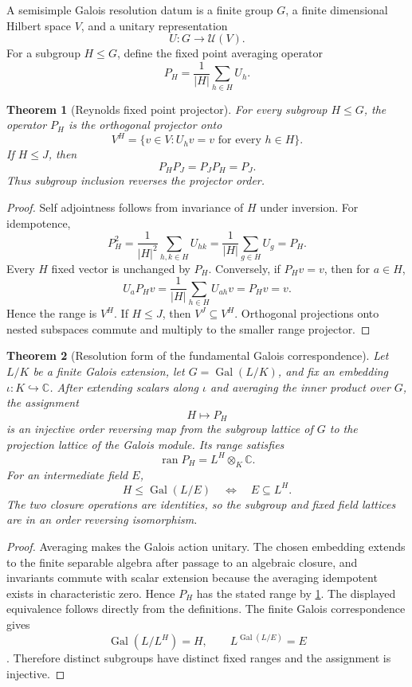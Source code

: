 \documentclass{aomart}
\newtheorem{theorem}{Theorem}[section]
\theoremstyle{definition}
\theoremstyle{remark}
\newcommand{\CC}{\mathbb C}
\newcommand{\ran}{\operatorname{ran}}
\newcommand{\Gal}{\operatorname{Gal}}
\newcommand{\Rcite}[1]{\cite{#1}}
\begin{document}
\begin{definition}\label{def:galois_resolution_datum}
A semisimple Galois resolution datum is a finite group \(G\), a finite dimensional Hilbert space \(V\), and a unitary representation
\[
 U:G\longrightarrow\mathcal U(V).
\]
For a subgroup \(H\leq G\), define the fixed point averaging operator
\[
 \boxed{
 P_H
 =
 \frac1{|H|}\sum_{h\in H}U_h.
 }
\]
\end{definition}

\begin{theorem}[Reynolds fixed point projector]\label{thm:reynolds_projector}
For every subgroup \(H\leq G\), the operator \(P_H\) is the orthogonal projector onto
\[
 V^H
 =
 \{v\in V:U_hv=v\text{ for every }h\in H\}.
\]
If \(H\leq J\), then
\[
 \boxed{
 P_HP_J=P_JP_H=P_J.
 }
\]
Thus subgroup inclusion reverses the projector order.
\end{theorem}

\begin{proof}
Self adjointness follows from invariance of \(H\) under inversion. For idempotence,
\[
 P_H^2
 =
 \frac1{|H|^2}\sum_{h,k\in H}U_{hk}
 =
 \frac1{|H|}\sum_{g\in H}U_g
 =P_H.
\]
Every \(H\) fixed vector is unchanged by \(P_H\). Conversely, if \(P_Hv=v\), then for \(a\in H\),
\[
 U_aP_Hv
 =
 \frac1{|H|}\sum_{h\in H}U_{ah}v
 =P_Hv=v.
\]
Hence the range is \(V^H\). If \(H\leq J\), then \(V^J\subseteq V^H\). Orthogonal projections onto nested subspaces commute and multiply to the smaller range projector.
\end{proof}

\begin{theorem}[Resolution form of the fundamental Galois correspondence]\label{thm:resolution_galois_correspondence}
Let \(L/K\) be a finite Galois extension, let \(G=\Gal(L/K)\), and fix an embedding \(\iota:K\hookrightarrow\CC\). After extending scalars along \(\iota\) and averaging the inner product over \(G\), the assignment
\[
 \boxed{
 H\longmapsto P_H
 }
\]
is an injective order reversing map from the subgroup lattice of \(G\) to the projection lattice of the Galois module. Its range satisfies
\[
 \boxed{
 \ran P_H
 =
 L^H\otimes_K\CC.
 }
\]
For an intermediate field \(E\),
\[
 \boxed{
 H\leq\Gal(L/E)
 \quad\Longleftrightarrow\quad
 E\subseteq L^H.
 }
\]
The two closure operations are identities, so the subgroup and fixed field lattices are in an order reversing isomorphism.
\end{theorem}

\begin{proof}
Averaging makes the Galois action unitary. The chosen embedding extends to the finite separable algebra after passage to an algebraic closure, and invariants commute with scalar extension because the averaging idempotent exists in characteristic zero. Hence \(P_H\) has the stated range by \cref{thm:reynolds_projector}. The displayed equivalence follows directly from the definitions. The finite Galois correspondence gives
\[
 \Gal(L/L^H)=H,
 \qquad
 L^{\Gal(L/E)}=E
\]
\Rcite{R28}. Therefore distinct subgroups have distinct fixed ranges and the assignment is injective.
\end{proof}
\end{document}

